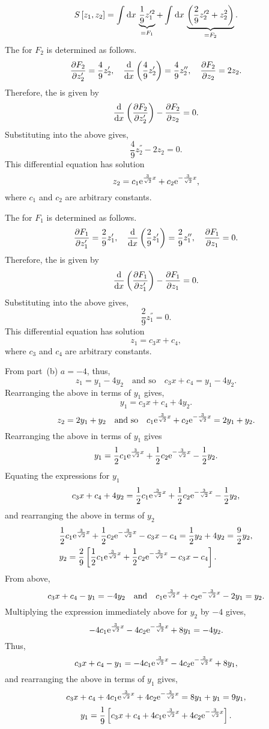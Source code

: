 \[
	S\left[z_1,z_2\right] = \Int{}{}{x} \underbrace{\frac{1}{9}z_1^{\prime2}}_{=F_1} + \Int{}{}{x}\underbrace{\left(\frac{2}{9}z_2^{\prime2} + z_2^2\right)}_{=F_2}.
\]
The \el for $F_2$ is determined as follows.
\[
	\pderiv{F_2}{z_2^\prime} =\frac{4}{9}z_2^\prime,\quad\deriv{}{x}\left(\frac{4}{9}z_2^\prime\right)=\frac{4}{9}z_2^\dprime,\quad \pderiv{F_2}{z_2} = 2z_2.
\]
Therefore, the \el is given by
\[
	\ELE{F_2}{x}{z_2}.
\]
Substituting into the above \el gives,
\[
	\frac{4}{9}z_2^\dprime -2z_2 = 0.
\]
This differential equation has solution
\begin{equation}
\label{eq:2.13}
	z_2 = c_1\e^{\frac{3}{\sqrt{2}}x} + c_2\e^{-\frac{3}{\sqrt{2}}x},
\end{equation}
where $c_1$ and $c_2$ are arbitrary constants.

The \el for $F_1$ is determined as follows.
\[
	\pderiv{F_1}{z_1^\prime} =\frac{2}{9}z_1^\prime,\quad\deriv{}{x}\left(\frac{2}{9}z_1^\prime\right)=\frac{2}{9}z_1^\dprime,\quad \pderiv{F_1}{z_1} = 0.
\]
Therefore, the \el is given by
\[
	\ELE{F_1}{x}{z_1}.
\]
Substituting into the above \el gives,
\[
	\frac{2}{9}z_1^\dprime = 0.
\]
This differential equation has solution
\begin{equation}
\label{eq:2.14}
	z_1 = c_3x + c_4,
\end{equation}
where $c_3$ and $c_4$ are arbitrary constants.

From part~(b) $a=-4$, thus,
\[
	z_1 = y_1 - 4y_2\quad \textrm{and so}\quad c_3x + c_4 = y_1 - 4y_2.
\]
Rearranging the above in terms of $y_1$ gives,
\[
	y_1 = c_3x+c_4+4y_2.
\]
\[
	z_2 =2y_1 + y_2\quad\textrm{and so}\quad c_1\e^{\frac{3}{\sqrt{2}}x} + c_2\e^{-\frac{3}{\sqrt{2}}x} = 2y_1 + y_2.
\]
Rearranging the above in terms of $y_1$ gives
\[
	y_1 = \half c_1\e^{\frac{3}{\sqrt{2}}x} + \half c_2\e^{-\frac{3}{\sqrt{2}}x} - \half y_2.
\]
Equating the expressions for $y_1$
\[
	c_3x + c_4 + 4y_2 = \half c_1\e^{\frac{3}{\sqrt{2}}x} + \half c_2\e^{-\frac{3}{\sqrt{2}}x} - \half y_2,
\]
and rearranging the above in terms of $y_2$
\begin{align*}
	{}&\half c_1\e^{\frac{3}{\sqrt{2}}x} + \half c_2\e^{-\frac{3}{\sqrt{2}}x} - c_3x - c_4 = \half y_2 + 4y_2 = \frac{9}{2}y_2,\\
	{}&y_2 = \frac{2}{9}\left[\half c_1\e^{\frac{3}{\sqrt{2}}x} + \half c_2\e^{-\frac{3}{\sqrt{2}}x} - c_3x - c_4\right].
\end{align*}
From above,
\[
	c_3x + c_4-y_1 = -4y_2\quad\textrm{and}\quad c_1\e^{\frac{3}{\sqrt{2}}x} + c_2\e^{-\frac{3}{\sqrt{2}}x} - 2y_1 =y_2.
\]
Multiplying the expression immediately above for $y_2$ by $-4$ gives,
\[
	-4c_1\e^{\frac{3}{\sqrt{2}}x} -4c_2\e^{-\frac{3}{\sqrt{2}}x} + 8y_1 =-4y_2.
\]
Thus, 
\[
	c_3x + c_4 - y_1 = -4c_1\e^{\frac{3}{\sqrt{2}}x} -4c_2\e^{-\frac{3}{\sqrt{2}}x} + 8y_1,
\]
and rearranging the above in terms of $y_1$ gives,
\[
	c_3x + c_4 + 4c_1\e^{\frac{3}{\sqrt{2}}x} + 4c_2\e^{-\frac{3}{\sqrt{2}}x} = 8y_1 + y_1 = 9y_1,
\]
\[
	y_1 = \frac{1}{9}\left[c_3x + c_4 + 4c_1\e^{\frac{3}{\sqrt{2}}x} + 4c_2\e^{-\frac{3}{\sqrt{2}}x}\right].
\]